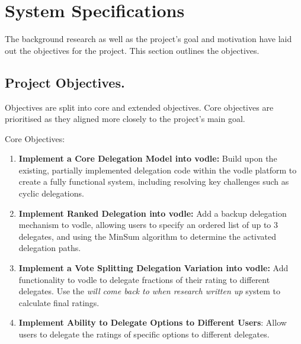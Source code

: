 \chapter{System Specifications}
\label{ch:specifications}
The background research as well as the project's goal and motivation have laid out the objectives for the project. This section outlines the objectives.
\section{Project Objectives.}
\label{section:project_objectives}
Objectives are split into core and extended objectives. Core objectives are prioritised as they aligned more closely to the project's main goal.

Core Objectives:
\begin{enumerate}
    \item \textbf{Implement a Core Delegation Model into vodle: } Build upon the existing, partially implemented delegation code within the vodle platform to create a fully functional system, including resolving key challenges such as cyclic delegations.

    \item \textbf{Implement Ranked Delegation into vodle: } Add a backup delegation mechanism to vodle, allowing users to specify an ordered list of up to 3 delegates, and using the MinSum algorithm to determine the activated delegation paths.

    \item \textbf{Implement a Vote Splitting Delegation Variation into vodle: } Add functionality to vodle to delegate fractions of their rating to different delegates. Use the \textit{will come back to when research written up} system to calculate final ratings.

    \item \textbf{Implement Ability to Delegate Options to Different Users}: Allow users to delegate the ratings of specific options to different delegates.
\end{enumerate}

